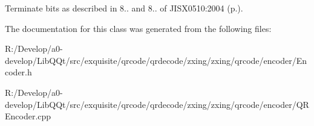 Terminate bits as described in 8.. and 8.. of J\+I\+S\+X0510\+:2004 (p.). 

The documentation for this class was generated from the following files\+:\begin{DoxyCompactItemize}
\item 
R\+:/\+Develop/a0-\/develop/\+Lib\+Q\+Qt/src/exquisite/qrcode/qrdecode/zxing/zxing/qrcode/encoder/Encoder.\+h\item 
R\+:/\+Develop/a0-\/develop/\+Lib\+Q\+Qt/src/exquisite/qrcode/qrdecode/zxing/zxing/qrcode/encoder/Q\+R\+Encoder.\+cpp\end{DoxyCompactItemize}

